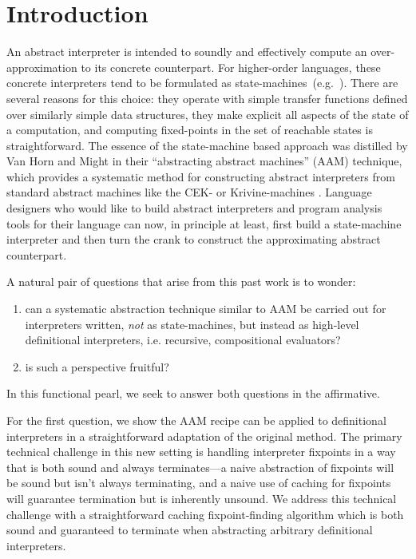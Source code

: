 \section{Introduction}

An abstract interpreter is intended to soundly and effectively compute
an over-approximation to its concrete counterpart.  For higher-order
languages, these concrete interpreters tend to be formulated as
state-machines~(e.g.~\cite{dvanhorn:jagannathan-weeks-popl95,
  dvanhorn:jagannathan-etal-popl98, 
  dvanhorn:wright-jagannathan-toplas98,
  dvanhorn:Might:2006:DeltaCFA,
  dvanhorn:midtgaard-jensen-sas-08,
  dvanhorn:Midtgaard2009Controlflow,
  dvanhorn:Might2011Family, dvanhorn:Sergey2013Monadic}).  There are
several reasons for this choice: they operate with simple transfer
functions defined over similarly simple data structures, they make
explicit all aspects of the state of a computation, and computing
fixed-points in the set of reachable states is straightforward.
%
The essence of the state-machine based approach was distilled by Van
Horn and Might in their ``abstracting abstract machines'' (AAM)
technique, which provides a systematic method for constructing
abstract interpreters from standard abstract machines like the CEK- or
Krivine-machines \cite{dvanhorn:VanHorn2010Abstracting}.  Language
designers who would like to build abstract interpreters and program
analysis tools for their language can now, in principle at least,
first build a state-machine interpreter and then turn the crank to
construct the approximating abstract counterpart.

A natural pair of questions that arise from this past work is to
wonder:
\begin{enumerate}
  \item can a systematic abstraction technique similar to AAM  be
carried out for interpreters written, \emph{not} as state-machines,
but instead as high-level definitional interpreters, i.e. recursive,
compositional evaluators?
\item  is such a perspective fruitful?
\end{enumerate}
In this functional pearl, we seek to answer both questions in the
affirmative.

For the first question, we show the AAM recipe can be applied
to definitional interpreters in a straightforward adaptation of the
original method. The primary technical challenge in this new setting
is handling interpreter fixpoints in a way that is both sound and
always terminates---a naive abstraction of fixpoints will be sound but
isn't always terminating, and a naive use of caching for fixpoints
will guarantee termination but is inherently unsound. We address this
technical challenge with a straightforward caching fixpoint-finding
algorithm which is both sound and guaranteed to terminate when abstracting
arbitrary definitional interpreters.


